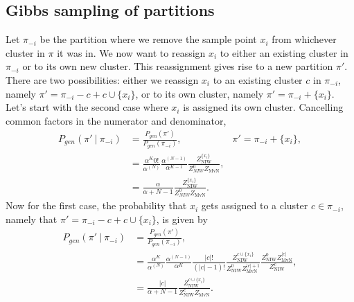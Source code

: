 \documentclass[11pt, oneside]{article}   	%
\DeclareMathOperator{\NIW}{NIW}
\DeclareMathOperator{\MvN}{MvN}
\begin{document}
\subsection{Gibbs sampling of partitions}
Let $\pi_{-i}$ be the partition where we remove the sample point $x_i$ from whichever cluster in $\pi$ it was in. We now want to reassign $x_i$ to either an existing cluster in $\pi_{-i}$ or to its own new cluster. This reassignment gives rise to a new partition $\pi'$. There are two possibilities: either we reassign $x_i$ to an existing cluster $c$ in $\pi_{-i}$, namely $\pi' = \pi_{-i} - c + c\cup\lbrace x_i\rbrace$, or to its own cluster, namely $\pi' = \pi_{-i} + \lbrace x_i\rbrace$. Let's start with the second case where $x_i$ is assigned its own cluster. Cancelling common factors in the numerator and denominator,
\begin{equation}\begin{aligned}
P_{gen}(\pi'~\vert~\pi_{-i}) &= \frac{P_{gen}(\pi')}{P_{gen}(\pi_{-i})}, &  \pi' = \pi_{-i} + \lbrace x_i\rbrace,\\
&=\frac{\alpha^K 0!}{\alpha^{(N)}}\frac{\alpha^{(N-1)}}{\alpha^{K-1}}\frac{Z^{\lbrace x_i\rbrace}_{\NIW}}{Z_{NIW}^0 Z_{\MvN}},\\
&= \frac{\alpha}{\alpha + N - 1}\frac{Z^{\lbrace x_i\rbrace}_{\NIW}}{Z_{NIW}^0 Z_{\MvN}}.
\end{aligned}\label{eq:gibbsnewcluster}\end{equation}
Now for the first case, the probability that $x_i$ gets assigned to a cluster $c\in\pi_{-i}$, namely that $\pi' = \pi_{-i} - c + c\cup\lbrace x_i\rbrace$, is given by
\begin{equation}\begin{split}
P_{gen}(\pi'~\vert~\pi_{-i}) &= \frac{P_{gen}(\pi')}{P_{gen}(\pi_{-i})}, \\
&=\frac{\alpha^K}{\alpha^{(N)}}\frac{\alpha^{(N-1)}}{\alpha^{K}}\frac{\vert c\vert!}{(\vert c\vert - 1)!}\frac{Z^{c\cup\lbrace x_i\rbrace}_{\NIW}}{Z_{\NIW}^0 Z_{\MvN}^{\vert c\vert + 1}}\frac{Z_{\NIW}^0 Z_{\MvN}^{\vert c\vert}}{Z_{\NIW}^{c}},\\
&= \frac{\vert c\vert}{\alpha + N - 1}\frac{Z_{\NIW}^{c\cup\lbrace x_i\rbrace}}{Z_{\NIW}^c Z_{\MvN}}.
\end{split}\label{eq:gibbsoldcluster}\end{equation}
\end{document}
